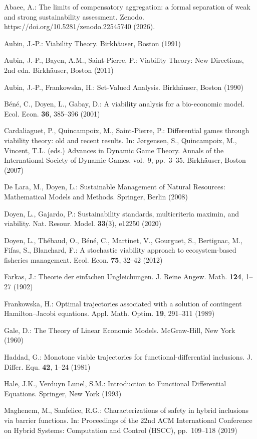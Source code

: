 \documentclass[11pt]{article}
\begin{document}
Abaee, A.: The limits of compensatory aggregation: a formal separation of weak and strong sustainability assessment. Zenodo. https://doi.org/10.5281/zenodo.22545740 (2026).

Aubin, J.-P.: Viability Theory. Birkh\"auser, Boston (1991)

Aubin, J.-P., Bayen, A.M., Saint-Pierre, P.: Viability Theory: New Directions, 2nd edn. Birkh\"auser, Boston (2011)

Aubin, J.-P., Frankowska, H.: Set-Valued Analysis. Birkh\"auser, Boston (1990)

B\'en\'e, C., Doyen, L., Gabay, D.: A viability analysis for a bio-economic
model. Ecol. Econ. \textbf{36}, 385--396 (2001)

Cardaliaguet, P., Quincampoix, M., Saint-Pierre, P.: Differential games
through viability theory: old and recent results. In: J\o{}rgensen, S.,
Quincampoix, M., Vincent, T.L. (eds.) Advances in Dynamic Game Theory.
Annals of the International Society of Dynamic Games, vol.~9, pp.~3--35.
Birkh\"auser, Boston (2007)

De Lara, M., Doyen, L.: Sustainable Management of Natural Resources:
Mathematical Models and Methods. Springer, Berlin (2008)

Doyen, L., Gajardo, P.: Sustainability standards, multicriteria maximin,
and viability. Nat. Resour. Model. \textbf{33}(3), e12250 (2020)

Doyen, L., Th\'ebaud, O., B\'en\'e, C., Martinet, V., Gourguet, S., Bertignac,
M., Fifas, S., Blanchard, F.: A stochastic viability approach to
ecosystem-based fisheries management. Ecol. Econ. \textbf{75}, 32--42
(2012)

Farkas, J.: Theorie der einfachen Ungleichungen. J. Reine Angew. Math.
\textbf{124}, 1--27 (1902)

Frankowska, H.: Optimal trajectories associated with a solution of
contingent Hamilton--Jacobi equations. Appl. Math. Optim. \textbf{19},
291--311 (1989)

Gale, D.: The Theory of Linear Economic Models. McGraw-Hill, New York
(1960)

Haddad, G.: Monotone viable trajectories for functional-differential
inclusions. J. Differ. Equ. \textbf{42}, 1--24 (1981)

Hale, J.K., Verduyn Lunel, S.M.: Introduction to Functional Differential
Equations. Springer, New York (1993)

Maghenem, M., Sanfelice, R.G.: Characterizations of safety in hybrid
inclusions via barrier functions. In: Proceedings of the 22nd ACM
International Conference on Hybrid Systems: Computation and Control
(HSCC), pp.~109--118 (2019)
\end{document}
